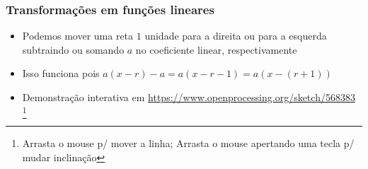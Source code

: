 \documentclass[usenames,dvipsnames,svgnames]{beamer}
\begin{document}
\begin{frame}
	\frametitle{Transformações em funções lineares}

	\begin{itemize}
		\item Podemos mover uma reta $1$ unidade para a direita ou para a esquerda subtraindo ou somando $a$ no coeficiente linear, respectivamente
		\item Isso funciona pois $a(x-r) - a = a(x-r-1) = a(x-(r+1))$
		\item Demonstração interativa em \url{https://www.openprocessing.org/sketch/568383} \footnote{Arrasta o mouse p/ mover a linha; Arrasta o mouse apertando uma tecla p/ mudar inclinação}
	\end{itemize}

	\begin{adjustbox}{max totalsize={\textwidth}{.5\textheight},center}
	\end{adjustbox}
\end{frame}
\end{document}
